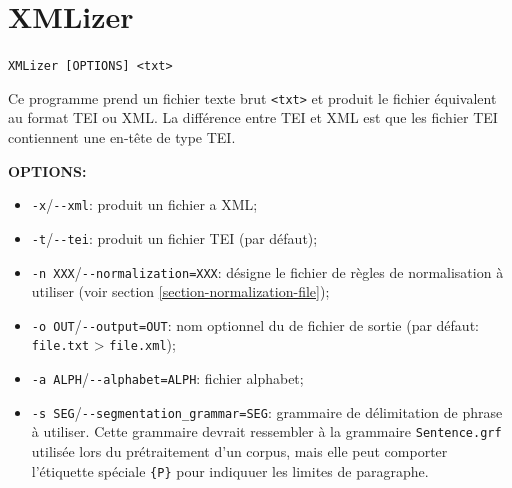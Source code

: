 \section{XMLizer}
\label{section-XMLizer}
\verb+XMLizer [OPTIONS] <txt>+

\bigskip
\noindent Ce programme prend un fichier texte brut \verb+<txt>+  et produit le fichier équivalent
au format TEI ou XML. La  différence entre TEI et XML est que les fichier TEI contiennent une en-tête de type TEI.

\bigskip
\noindent \textbf{OPTIONS:}
\begin{itemize}
\item \verb+-x+/\verb+--xml+: produit un fichier a XML;
  
  \item \verb+-t+/\verb+--tei+: produit un fichier TEI (par défaut);

  \item \verb+-n XXX+/\verb+--normalization=XXX+: désigne le fichier de règles de normalisation
  	  à utiliser (voir section \ref{section-normalization-file});

  \item \verb+-o OUT+/\verb+--output=OUT+: nom optionnel du de fichier de sortie (par défaut:
  \verb+file.txt+ > \verb+file.xml+);

  \item \verb+-a ALPH+/\verb+--alphabet=ALPH+: fichier alphabet;
  
  \item \verb+-s SEG+/\verb+--segmentation_grammar=SEG+: grammaire de délimitation de phrase à utiliser. Cette grammaire devrait ressembler à la grammaire \verb+Sentence.grf+ utilisée
  	  lors du prétraitement d'un corpus, mais elle peut comporter l'étiquette spéciale \verb+{P}+ pour indiquuer les limites de paragraphe.
\end{itemize}

